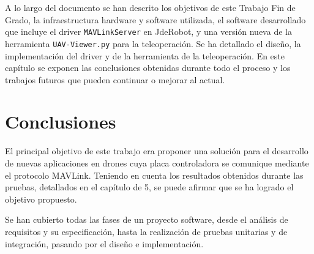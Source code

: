 A lo largo del documento se han descrito los objetivos de este Trabajo Fin de Grado, la infraestructura hardware y software utilizada, el software desarrollado que incluye el driver \texttt{MAVLinkServer} en JdeRobot, y una versión nueva de la herramienta \texttt{UAV-Viewer.py} para la teleoperación. Se ha detallado el diseño, la implementación del driver y de la herramienta de la teleoperación. En este capítulo se exponen las conclusiones obtenidas durante todo el proceso y los trabajos futuros que pueden continuar o mejorar al actual.

\section{Conclusiones}

El principal objetivo de este trabajo era proponer una solución para el desarrollo de nuevas aplicaciones en drones cuya placa controladora se comunique mediante el protocolo MAVLink. Teniendo en cuenta los resultados obtenidos durante las pruebas, detallados en el capítulo de 5, se puede afirmar que se ha logrado el objetivo propuesto. 

Se han cubierto todas las fases de un proyecto software, desde el análisis de requisitos y su especificación, hasta la realización de pruebas unitarias y de integración, pasando por el diseño e implementación. 

